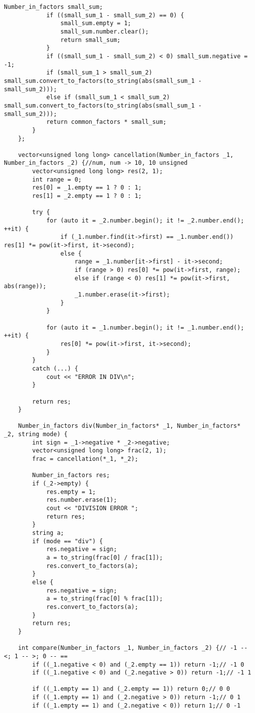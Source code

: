 \begin{lstlisting}[label = list1, caption = Программная реализация описанных алгоритмов]
			Number_in_factors small_sum;
			if ((small_sum_1 - small_sum_2) == 0) {
				small_sum.empty = 1;
				small_sum.number.clear();
				return small_sum;
			}
			if ((small_sum_1 - small_sum_2) < 0) small_sum.negative = -1;
			if (small_sum_1 > small_sum_2) small_sum.convert_to_factors(to_string(abs(small_sum_1 - small_sum_2)));
			else if (small_sum_1 < small_sum_2) small_sum.convert_to_factors(to_string(abs(small_sum_1 - small_sum_2)));
			return common_factors * small_sum;
		}
	};
	
	vector<unsigned long long> cancellation(Number_in_factors _1, Number_in_factors _2) {//num, num -> 10, 10 unsigned
		vector<unsigned long long> res(2, 1);
		int range = 0;
		res[0] = _1.empty == 1 ? 0 : 1;
		res[1] = _2.empty == 1 ? 0 : 1;
		
		try {
			for (auto it = _2.number.begin(); it != _2.number.end(); ++it) {
				if (_1.number.find(it->first) == _1.number.end())  res[1] *= pow(it->first, it->second);
				else {
					range = _1.number[it->first] - it->second;
					if (range > 0) res[0] *= pow(it->first, range);
					else if (range < 0) res[1] *= pow(it->first, abs(range));
					_1.number.erase(it->first);
				}
			}
			
			for (auto it = _1.number.begin(); it != _1.number.end(); ++it) {
				res[0] *= pow(it->first, it->second);
			}
		}
		catch (...) {
			cout << "ERROR IN DIV\n";
		}
		
		return res;
	}
	
	Number_in_factors div(Number_in_factors* _1, Number_in_factors* _2, string mode) {
		int sign = _1->negative * _2->negative;
		vector<unsigned long long> frac(2, 1);
		frac = cancellation(*_1, *_2);
		
		Number_in_factors res;
		if (_2->empty) {
			res.empty = 1;
			res.number.erase(1);
			cout << "DIVISION ERROR ";
			return res;
		}
		string a;
		if (mode == "div") {
			res.negative = sign;
			a = to_string(frac[0] / frac[1]);
			res.convert_to_factors(a);
		}
		else {
			res.negative = sign;
			a = to_string(frac[0] % frac[1]);
			res.convert_to_factors(a);
		}
		return res;
	}
	
	int compare(Number_in_factors _1, Number_in_factors _2) {// -1 -- <; 1 -- >; 0 -- ==
		if ((_1.negative < 0) and (_2.empty == 1)) return -1;// -1 0
		if ((_1.negative < 0) and (_2.negative > 0)) return -1;// -1 1
		
		if ((_1.empty == 1) and (_2.empty == 1)) return 0;// 0 0
		if ((_1.empty == 1) and (_2.negative > 0)) return -1;// 0 1
		if ((_1.empty == 1) and (_2.negative < 0)) return 1;// 0 -1
		

\end{lstlisting}
